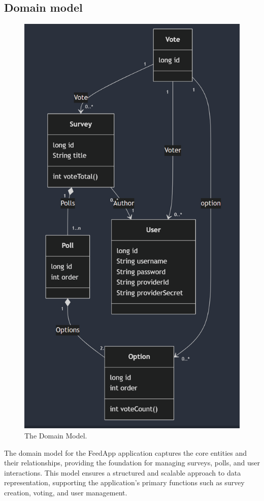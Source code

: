 \subsection{Domain model}
\begin{figure}[!htbp]
	\centering
	\includegraphics[scale=0.5]{figs/domainmodel.png}
	\caption{The Domain Model.}
	\label{fig:domainmodel}
\end{figure}
The domain model for the FeedApp application captures the core entities and their relationships, providing the foundation for managing surveys, polls, and user interactions. This model ensures a structured and scalable approach to data representation, supporting the application's primary functions such as survey creation, voting, and user management.
\medskip

